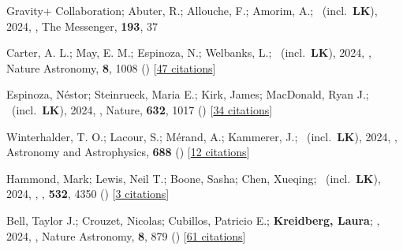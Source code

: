 \item[{\color{numcolor}\scriptsize121}] Gravity+ Collaboration; Abuter, R.; Allouche, F.; Amorim, A.; \etal\ (incl.\ \textbf{LK}), 2024, , The Messenger, \textbf{193}, 37

\item[{\color{numcolor}\scriptsize120}] Carter, A. L.; May, E. M.; Espinoza, N.; Welbanks, L.; \etal\ (incl.\ \textbf{LK}), 2024, , Nature Astronomy, \textbf{8}, 1008 () [\href{https://ui.adsabs.harvard.edu/abs/2024NatAs...8.1008C}{47 citations}]

\item[{\color{numcolor}\scriptsize119}] Espinoza, N{\'e}stor; Steinrueck, Maria E.; Kirk, James; MacDonald, Ryan J.; \etal\ (incl.\ \textbf{LK}), 2024, , Nature, \textbf{632}, 1017 () [\href{https://ui.adsabs.harvard.edu/abs/2024Natur.632.1017E}{34 citations}]

\item[{\color{numcolor}\scriptsize118}] Winterhalder, T. O.; Lacour, S.; M{\'e}rand, A.; Kammerer, J.; \etal\ (incl.\ \textbf{LK}), 2024, , Astronomy and Astrophysics, \textbf{688} () [\href{https://ui.adsabs.harvard.edu/abs/2024A&A...688A..44W}{12 citations}]

\item[{\color{numcolor}\scriptsize117}] Hammond, Mark; Lewis, Neil T.; Boone, Sasha; Chen, Xueqing; \etal\ (incl.\ \textbf{LK}), 2024, , \mnras, \textbf{532}, 4350 () [\href{https://ui.adsabs.harvard.edu/abs/2024MNRAS.532.4350H}{3 citations}]

\item[{\color{numcolor}\scriptsize116}] Bell, Taylor J.; Crouzet, Nicolas; Cubillos, Patricio E.; \textbf{Kreidberg, Laura}; \etal, 2024, , Nature Astronomy, \textbf{8}, 879 () [\href{https://ui.adsabs.harvard.edu/abs/2024NatAs...8..879B}{61 citations}]

